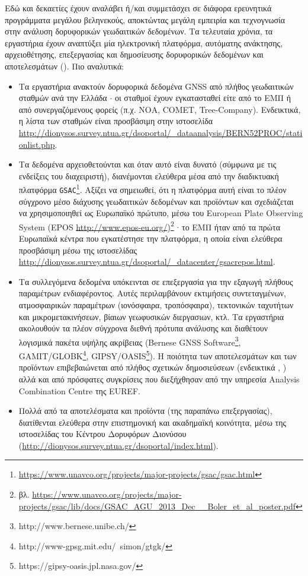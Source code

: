 \documentclass[11pt]{article}
\begin{document}
Εδώ και δεκαετίες έχουν αναλάβει ή/και συμμετάσχει σε διάφορα ερευνητικά προγράμματα μεγάλου βεληνεκούς, 
αποκτώντας μεγάλη εμπειρία και τεχνογνωσία στην ανάλυση δορυφορικών γεωδαιτικών δεδομένων. Τα τελευταία 
χρόνια, τα εργαστήρια έχουν αναπτύξει μία ηλεκτρονική πλατφόρμα, αυτόματης ανάκτησης, αρχειοθέτησης, 
επεξεργασίας και δημοσίευσης δορυφορικών δεδομένων και αποτελεσμάτων (\cite{papanikegu}). Πιο αναλυτικά:

\begin{itemize}
\item Τα εργαστήρια ανακτούν δορυφορικά δεδομένα GNSS από πλήθος γεωδαιτικών σταθμών ανά την Ελλάδα $\cdot$ οι σταθμοί έχουν
εγκατασταθεί είτε από το ΕΜΠ ή από συνεργαζόμενους φορείς (π.χ. ΝΟΑ, COMET, Tree-Company). Ενδεικτικά, η λίστα των σταθμών είναι προσβάσιμη στην ιστοσελίδα \url{http://dionysos.survey.ntua.gr/dsoportal/_dataanalysis/BERN52PROC/stationlist.php}.

\item Τα δεδομένα αρχειοθετούνται και όταν αυτό είναι δυνατό (σύμφωνα με τις ενδείξεις του διαχειριστή), διανέμονται ελεύθερα μέσα από την διαδικτυακή πλατφόρμα \texttt{GSAC}\footnote{\url{https://www.unavco.org/projects/major-projects/gsac/gsac.html}}. Αξίζει να σημειωθεί, ότι η πλατφόρμα αυτή είναι το πλέον σύγχρονο μέσο διάχυσης γεωδαιτικών δεδομένων και προϊόντων και σχεδιάζεται να χρησιμοποιηθεί ως Ευρωπαϊκό πρώτυπο, μέσω του European Plate Observing System (EPOS \url{http://www.epos-eu.org/})\footnote{βλ. \url{https://www.unavco.org/projects/major-projects/gsac/lib/docs/GSAC_AGU_2013_Dec__Boler_et_al_poster.pdf}} $\cdot$ το ΕΜΠ ήταν από τα πρώτα Ευρωπαϊκά κέντρα που εγκατέστησε την πλατφόρμα, η οποία είναι ελεύθερα προσβάσιμη μέσω της ιστοσελίδας \url{http://dionysos.survey.ntua.gr/dsoportal/_datacenter/gsacrepos.html}.

\item Τα συλλεγόμενα δεδομένα υπόκεινται σε επεξεργασία για την εξαγωγή πλήθους παραμέτρων ενδιαφέροντος. Αυτές περιλαμβάνουν εκτιμήσεις συντεταγμένων, ατμοσφαιρικών παραμέτρων (ιονόσφαιρα, τροπόσφαιρα), τεκτονικών ταχυτήτων και μικρομετακινήσεων, βίαιων γεωφυσικών διεργασιων, κτλ. Τα εργαστήρια ακολουθούν τα πλέον σύγχρονα διεθνή πρότυπα ανάλυσης και διαθέτουν λογισμικά πακέτα υψήλης ακρίβειας (Bernese GNSS Software\footnote{http://www.bernese.unibe.ch/}, GAMIT/GLOBK\footnote{http://www-gpsg.mit.edu/~simon/gtgk/}, GIPSY/OASIS\footnote{https://gipsy-oasis.jpl.nasa.gov/}). Η ποιότητα των αποτελεσμάτων και των προϊόντων επιβεβαιώνεται από πλήθος σχετικών δημοσιεύσεων (ενδεικτικά \cite{anastacep}, \cite{GRL50066}) αλλά και από πρόσφατες συγκρίσεις που διεξήχθησαν από την υπηρεσία Analysis Combination Centre της EUREF.

\item Πολλά από τα αποτελέσματα και προϊόντα (της παραπάνω επεξεργασίας), διατίθενται ελεύθερα στην επιστημονική και ακαδημαϊκή κοινότητα, μέσω της ιστοσελίδας του Κέντρου Δορυφόρων Διονύσου (\url{http://dionysos.survey.ntua.gr/dsoportal/index.html}).
\end{itemize}
\end{document}
